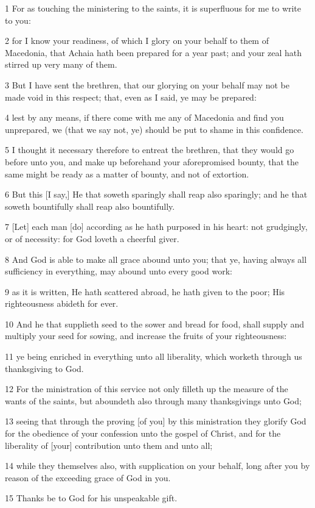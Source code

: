 \par 1 For as touching the ministering to the saints, it is superfluous for me to write to you:
\par 2 for I know your readiness, of which I glory on your behalf to them of Macedonia, that Achaia hath been prepared for a year past; and your zeal hath stirred up very many of them.
\par 3 But I have sent the brethren, that our glorying on your behalf may not be made void in this respect; that, even as I said, ye may be prepared:
\par 4 lest by any means, if there come with me any of Macedonia and find you unprepared, we (that we say not, ye) should be put to shame in this confidence.
\par 5 I thought it necessary therefore to entreat the brethren, that they would go before unto you, and make up beforehand your aforepromised bounty, that the same might be ready as a matter of bounty, and not of extortion.
\par 6 But this [I say,] He that soweth sparingly shall reap also sparingly; and he that soweth bountifully shall reap also bountifully.
\par 7 [Let] each man [do] according as he hath purposed in his heart: not grudgingly, or of necessity: for God loveth a cheerful giver.
\par 8 And God is able to make all grace abound unto you; that ye, having always all sufficiency in everything, may abound unto every good work:
\par 9 as it is written, He hath scattered abroad, he hath given to the poor; His righteousness abideth for ever.
\par 10 And he that supplieth seed to the sower and bread for food, shall supply and multiply your seed for sowing, and increase the fruits of your righteousness:
\par 11 ye being enriched in everything unto all liberality, which worketh through us thanksgiving to God.
\par 12 For the ministration of this service not only filleth up the measure of the wants of the saints, but aboundeth also through many thanksgivings unto God;
\par 13 seeing that through the proving [of you] by this ministration they glorify God for the obedience of your confession unto the gospel of Christ, and for the liberality of [your] contribution unto them and unto all;
\par 14 while they themselves also, with supplication on your behalf, long after you by reason of the exceeding grace of God in you.
\par 15 Thanks be to God for his unspeakable gift.

